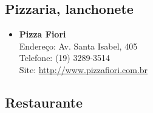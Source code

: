 \subsection{Pizzaria, lanchonete}

\begin{itemize}
\item \textbf{Pizza Fiori}
  \\Endereço: Av. Santa Isabel, 405
  \\Telefone: (19) 3289-3514
  \\Site: \url{http://www.pizzafiori.com.br}
\end{itemize}

\subsection{Restaurante}

